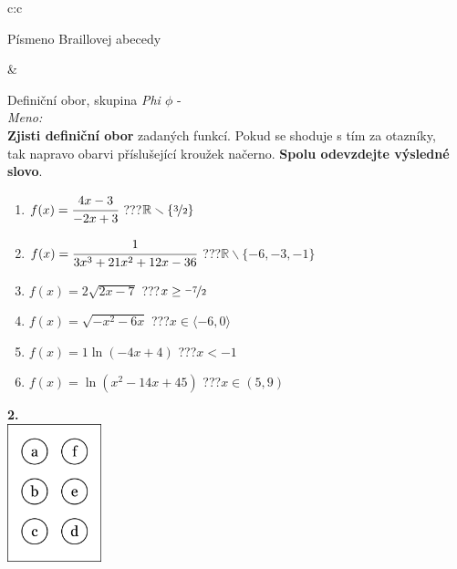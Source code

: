 \documentclass[10pt]{report}
\begin{document}
\begin{tabular}{c:c}
\begin{minipage}[c][99mm][t]{0.49\linewidth}
\begin{center}
\begin{minipage}{0.20\linewidth}
\begin{center}
{\small Písmeno Braillovej abecedy}
\end{center}
\end{minipage}
\end{center}
\end{minipage}
&
\begin{minipage}[c][99mm][t]{0.49\linewidth}
\begin{center}
\vspace{7mm}
{\huge Definiční obor, skupina \textit{Phi $\phi$} -}\\[4.5mm]
\textit{Meno:}\phantom{xxxxxxxxxxxxxxxxxxxxxxxxxxxxxxxxxxxxxxxxxxxxxxxxxxxxxxxxxxxxxxxxx}\\[3.5mm]
\textbf{Zjisti definiční obor} zadaných funkcí. Pokud se shoduje s tím za otazníky,\\tak napravo obarvi příslušející kroužek načerno. \textbf{Spolu odevzdejte výsledné slovo}.\\[3mm]
\begin{minipage}{0.77\linewidth}
\begin{center}
\begin{varwidth}{\textwidth}
\begin{enumerate}
\normalsize
\item $f(x)=\cfrac{4x-3}{-2x+3}$\quad \dotfill\; ???\;\dotfill \quad $\mathbb{R}\smallsetminus\{\nicefrac{3}{2}\}$
\item $f(x)=\cfrac{1}{3x^3+21x^2+12x-36}$\quad \dotfill\; ???\;\dotfill \quad $\mathbb{R}\smallsetminus\{-6,-3,-1\}$
\item $f(x)=2\sqrt{2x-7}$\quad \dotfill\; ???\;\dotfill \quad $x\geq\nicefrac{-7}{2}$
\item $f(x)=\sqrt{-x^2-6x}$\quad \dotfill\; ???\;\dotfill \quad $x\in\langle-6 , 0\rangle$
\item $f(x)=1\ln{(-4x+4)}$\quad \dotfill\; ???\;\dotfill \quad $x<-1$
\item $f(x)=\ln{(x^2-14x+45)}$\quad \dotfill\; ???\;\dotfill \quad $x\in(5 , 9)$
\end{enumerate}
\end{varwidth}
\end{center}
\end{minipage}
\begin{minipage}{0.20\linewidth}
\begin{center}
{\Huge\bfseries 2.} \\[2mm]
\includegraphics[height=40mm]{../images/braille.png}

\end{center}
\end{minipage}
\end{center}
\end{minipage}
\end{tabular}
\end{document}
